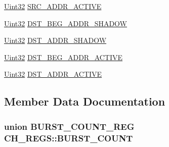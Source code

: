 \begin{DoxyCompactItemize}
\item 
\hyperlink{_d_s_p2833x___device_8h_aba99025e657f892beb7ff31cecf64653}{Uint32} \hyperlink{struct_c_h___r_e_g_s_aaacddf85aeccf36e1001ebb92e60d402}{S\+R\+C\+\_\+\+A\+D\+D\+R\+\_\+\+A\+C\+T\+I\+V\+E}
\item 
\hyperlink{_d_s_p2833x___device_8h_aba99025e657f892beb7ff31cecf64653}{Uint32} \hyperlink{struct_c_h___r_e_g_s_a8cf5f6fc351f6f592ab76361a5ba352f}{D\+S\+T\+\_\+\+B\+E\+G\+\_\+\+A\+D\+D\+R\+\_\+\+S\+H\+A\+D\+O\+W}
\item 
\hyperlink{_d_s_p2833x___device_8h_aba99025e657f892beb7ff31cecf64653}{Uint32} \hyperlink{struct_c_h___r_e_g_s_a1c07b8a6f20f33ac7c23f6f5a1022090}{D\+S\+T\+\_\+\+A\+D\+D\+R\+\_\+\+S\+H\+A\+D\+O\+W}
\item 
\hyperlink{_d_s_p2833x___device_8h_aba99025e657f892beb7ff31cecf64653}{Uint32} \hyperlink{struct_c_h___r_e_g_s_a1386af701df49142e6efa49ff5f8266e}{D\+S\+T\+\_\+\+B\+E\+G\+\_\+\+A\+D\+D\+R\+\_\+\+A\+C\+T\+I\+V\+E}
\item 
\hyperlink{_d_s_p2833x___device_8h_aba99025e657f892beb7ff31cecf64653}{Uint32} \hyperlink{struct_c_h___r_e_g_s_ab132bdbcad9c625a9dfe164ff0d7e711}{D\+S\+T\+\_\+\+A\+D\+D\+R\+\_\+\+A\+C\+T\+I\+V\+E}
\end{DoxyCompactItemize}


\subsection{Member Data Documentation}
\hypertarget{struct_c_h___r_e_g_s_ad12e5e7af49db054eaae0252506d589b}{}
\subsubsection[{B\+U\+R\+S\+T\+\_\+\+C\+O\+U\+N\+T}]{\setlength{\rightskip}{0pt plus 5cm}union {\bf B\+U\+R\+S\+T\+\_\+\+C\+O\+U\+N\+T\+\_\+\+R\+E\+G} C\+H\+\_\+\+R\+E\+G\+S\+::\+B\+U\+R\+S\+T\+\_\+\+C\+O\+U\+N\+T}\label{struct_c_h___r_e_g_s_ad12e5e7af49db054eaae0252506d589b}
\hypertarget{struct_c_h___r_e_g_s_a3ac1f9e1edf58bc3701f8caad47c4b52}{}
